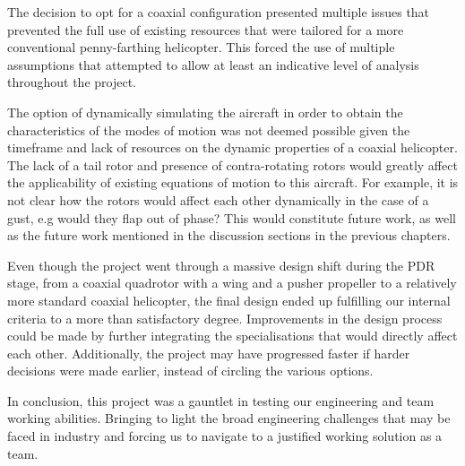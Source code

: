 \documentclass[11pt,a4paper]{article}
\begin{document}
The decision to opt for a coaxial configuration presented multiple issues that prevented the full use of existing resources that were tailored for a more conventional penny-farthing helicopter. This forced the use of multiple assumptions that attempted to allow at least an indicative level of analysis throughout the project.

The option of dynamically simulating the aircraft in order to obtain the characteristics of the modes of motion was not deemed possible given the timeframe and lack of resources on the dynamic properties of a coaxial helicopter. The lack of a tail rotor and presence of contra-rotating rotors would greatly affect the applicability of existing equations of motion to this aircraft. For example, it is not clear how the rotors would affect each other dynamically in the case of a gust, e.g would they flap out of phase? This would constitute future work, as well as the future work mentioned in the discussion sections in the previous chapters.

Even though the project went through a massive design shift during the PDR stage, from a coaxial quadrotor with a wing and a pusher propeller to a relatively more standard coaxial helicopter, the final design ended up fulfilling our internal criteria to a more than satisfactory degree.
Improvements in the design process could be made by further integrating the specialisations that would directly affect each other. Additionally, the project may have progressed faster if harder decisions were made earlier, instead of circling the various options.

In conclusion, this project was a gauntlet in testing our engineering and team working abilities. Bringing to light the broad engineering challenges that may be faced in industry and forcing us to navigate to a justified working solution as a team.
\end{document}
